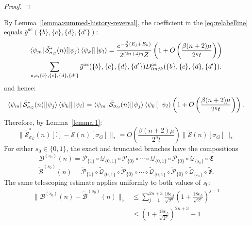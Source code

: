 \documentclass[aps,floatfix,10pt,amssymb,amsfont,amsmath,superscriptaddress,float,nofootinbib,longbibliography,nobalancelastpage,twocolumn]{revtex4-2}
\begin{document}
\begin{widetext}
\begin{proof}
\end{proof}
By Lemma~\ref{lemma:summed-history-reversal}, the coefficient in the \eqref{eq:relabelline} equals $\bar g^{ae}(\{b\},\{c\},\{d\},\{d'\})$:
\begin{multline}
     \bra{\psi_m}\tilde{\mathcal{S}}^*_{\sigma_G}(n)[\ket{\psi_j}\bra{\psi_k}]\ket{\psi_l} = \frac{e^{-\frac{\beta}{2}(E_j+E_k)}}{2^{(2n+4)\eta}Z}\left(1+O\left(\frac{\beta(n+2)\mu}{2^\eta t}\right)\right)\\\sum_{a,e,\{b\},\{c\},\{d\},\{d'\}} \bar{g}^{ae}(\{b\},\{c\},\{d\},\{d'\}) D^{ae}_{lmjk}(\{b\},\{c\},\{d\},\{d'\}).
     \label{eq:relabelline}
\end{multline}
and hence:
\begin{equation}
    \bra{\psi_m}\tilde{\mathcal{S}}^*_{\sigma_G}(n)[\ket{\psi_j}\bra{\psi_k}]\ket{\psi_l} = \bra{\psi_m}\tilde{\mathcal{S}}_{\sigma_G}(n)[\ket{\psi_j}\bra{\psi_k}]\ket{\psi_l}\left(1+O\left(\frac{\beta(n+2)\mu}{2^\eta t}\right)\right).
\end{equation}
Therefore, by Lemma~\ref{lemma:1}:
\begin{equation}
    \|\tilde{\mathcal{S}}^*_{\sigma_G}(n)[\mathbb{I}] - \tilde{\mathcal{S}}(n)[\sigma_G]\|_* = O\left(\frac{\beta(n+2)\mu}{2^\eta t}\right)\|\tilde{\mathcal{S}}(n)[\sigma_G]\|_*
    \label{eq:Boutput}
\end{equation}
For either $s_0\in\{0,1\}$, the exact and truncated branches have the
compositions
\begin{equation}
    \mathcal{B}^{(s_0)}(n) = \mathcal{P}_{\{1\}}\circ\mathcal{Q}_{\{0,1\}}\circ\mathcal{P}_{\{0\}}\circ\cdots\circ\mathcal{Q}_{\{0,1\}}\circ\mathcal{P}_{\{0\}}\circ\mathcal{Q}_{\{s_0\}}\circ\mathfrak{E}
\end{equation}
\begin{equation}
    \tilde{\mathcal{B}}^{(s_0)}(n) = \tilde{\mathcal{P}}_{\{1\}}\circ\tilde {\mathcal{Q}}_{\{0,1\}}\circ\tilde{\mathcal{P}}_{\{0\}}\circ\cdots\circ\tilde{\mathcal{Q}}_{\{0,1\}}\circ\tilde{\mathcal{P}}_{\{0\}}\circ\tilde{\mathcal{Q}}_{\{s_0\}}\circ\tilde{\mathfrak{E}}.
\end{equation}
The same telescoping estimate applies uniformly to both values of $s_0$:
\begin{align}
    \|\mathcal{B}^{(s_0)}(n)-\tilde{\mathcal{B}}^{(s_0)}(n)\|_{\diamond}
    &\leq  \sum_{j=1}^{2n+3}\frac{18\epsilon_{\Delta}}{\sqrt{2^{\eta}}}\left(1+\frac{18\epsilon_{\Delta}}{\sqrt{2^{\eta}}}\right)^{j-1}\\
    &\leq  (1+\frac{18\epsilon_{\Delta}}{\sqrt{2^{\eta}}})^{2n+3}-1\\

\end{align}
\end{widetext}
\end{document}
